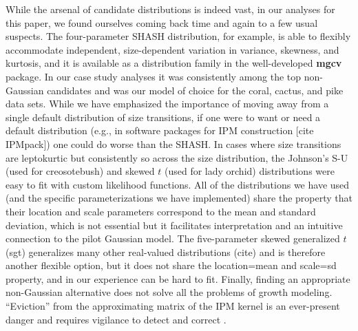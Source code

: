 \documentclass[12pt]{article}
\begin{document}
While the arsenal of candidate distributions is indeed vast, in our analyses for this paper, we found ourselves coming back time and again to a few usual suspects. 
The four-parameter SHASH distribution, for example, is able to flexibly accommodate independent, size-dependent variation in variance, skewness, and kurtosis, and it is available as a distribution family in the well-developed \textbf{mgcv} package. 
In our case study analyses it was consistently among the top non-Gaussian candidates and was our model of choice for the coral, cactus, and pike data sets. 
While we have emphasized the importance of moving away from a single default distribution of size transitions, if one were to want or need a default distribution (e.g., in software packages for IPM construction [cite IPMpack]) one could do worse than the SHASH. 
In cases where size transitions are leptokurtic but consistently so across the size distribution, the Johnson's S-U (used for creosotebush) and skewed $t$ (used for lady orchid) distributions were easy to fit with custom likelihood functions. 
All of the distributions we have used (and the specific parameterizations we have implemented) share the property that their location and scale parameters correspond to the mean and standard deviation, which is not essential but it facilitates interpretation and an intuitive connection to the pilot Gaussian model. 
The five-parameter skewed generalized $t$ (sgt) generalizes many other real-valued distributions (cite) and is therefore another flexible option, but it does not share the location=mean and scale=sd property, and in our experience can be hard to fit. 
Finally, finding an appropriate non-Gaussian alternative does not solve all the problems of growth modeling. 
``Eviction'' from the approximating matrix of the IPM kernel is an ever-present danger and requires vigilance to detect and correct \citep{williams2012avoiding}. 
\end{document}
